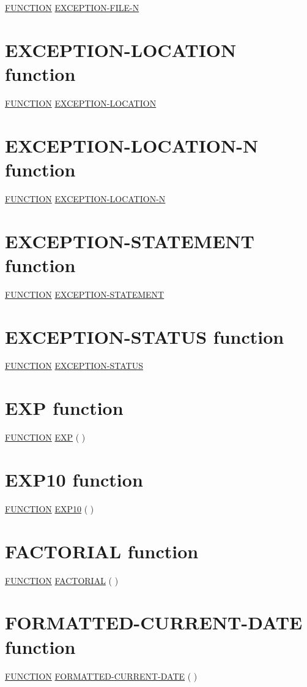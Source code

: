\documentclass[a4paper,oneside,svgnames]{scrbook}
\newcommand{\key}[1]{\underline{#1}}
\newcommand{\pending}[1]{%
  \textcolor{gray!75}{#1}}
\begin{document}
\pending{
  \key{FUNCTION} \key{EXCEPTION-FILE-N}
}

\section{EXCEPTION-LOCATION function}

\key{FUNCTION} \key{EXCEPTION-LOCATION}

\section{EXCEPTION-LOCATION-N function}

\pending{
  \key{FUNCTION} \key{EXCEPTION-LOCATION-N}
}

\section{EXCEPTION-STATEMENT function}

\key{FUNCTION} \key{EXCEPTION-STATEMENT}

\section{EXCEPTION-STATUS function}

\key{FUNCTION} \key{EXCEPTION-STATUS}

\section{EXP function}

\key{FUNCTION} \key{EXP} ( \argument )

\section{EXP10 function}

\key{FUNCTION} \key{EXP10} ( \argument )

\section{FACTORIAL function}

\key{FUNCTION} \key{FACTORIAL} ( \argument )

\section{FORMATTED-CURRENT-DATE function}

\key{FUNCTION} \key{FORMATTED-CURRENT-DATE} ( \argument )
\end{document}

